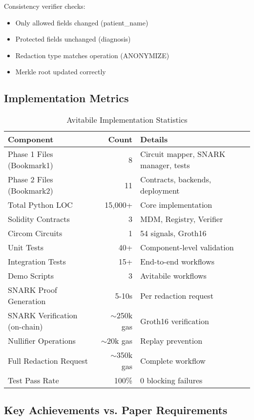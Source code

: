 Consistency verifier checks:
\begin{itemize}
    \item Only allowed fields changed (patient\_name)
    \item Protected fields unchanged (diagnosis)
    \item Redaction type matches operation (ANONYMIZE)
    \item Merkle root updated correctly
\end{itemize}

\subsection{Implementation Metrics}

\begin{table}[h]
\centering
\caption{Avitabile Implementation Statistics}
\begin{tabular}{@{}lrl@{}}
\toprule
\textbf{Component} & \textbf{Count} & \textbf{Details} \\
\midrule
Phase 1 Files (Bookmark1) & 8 & Circuit mapper, SNARK manager, tests \\
Phase 2 Files (Bookmark2) & 11 & Contracts, backends, deployment \\
Total Python LOC & 15,000+ & Core implementation \\
Solidity Contracts & 3 & MDM, Registry, Verifier \\
Circom Circuits & 1 & 54 signals, Groth16 \\
Unit Tests & 40+ & Component-level validation \\
Integration Tests & 15+ & End-to-end workflows \\
Demo Scripts & 3 & Avitabile workflows \\
\midrule
SNARK Proof Generation & 5-10s & Per redaction request \\
SNARK Verification (on-chain) & $\sim$250k gas & Groth16 verification \\
Nullifier Operations & $\sim$20k gas & Replay prevention \\
Full Redaction Request & $\sim$350k gas & Complete workflow \\
Test Pass Rate & 100\% & 0 blocking failures \\
\bottomrule
\end{tabular}
\end{table}

\subsection{Key Achievements vs. Paper Requirements}

